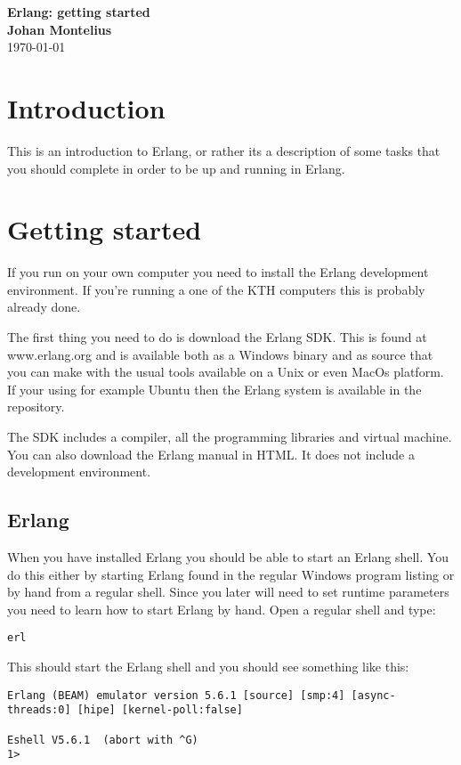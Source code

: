 \documentclass[a4paper,11pt]{article}
\newcommand{\nnsection}[1]{
\section*{#1}
\addcontentsline{toc}{section}{#1}
}
\begin{document}
\begin{center}
\vspace{20pt}
\textbf{\large Erlang: getting started}\\
\vspace{10pt}
\textbf{Johan Montelius}\\
\vspace{10pt}
\today{}
\end{center}

\nnsection{Introduction}

This is an introduction to Erlang, or rather its a description of some
tasks that you should complete in order to be up and running in Erlang.

\section{Getting started}

If you run on your own computer you need to install the Erlang
development environment. If you're running a one of the KTH computers
this is probably already done.

The first thing you need to do is download the Erlang SDK. This is
found at www.erlang.org and is available both as a Windows binary and
as source that you can make with the usual tools available on a Unix
or even MacOs platform. If your using for example Ubuntu then the
Erlang system is available in the repository.

The SDK includes a compiler, all the programming libraries and virtual
machine. You can also download the Erlang manual in HTML.  It does not
include a development environment.

\subsection{Erlang}

When you have installed Erlang you should be able to start an Erlang
shell. You do this either by starting Erlang found in the regular
Windows program listing or by hand from a regular shell. Since you
later will need to set runtime parameters you need to learn how to
start Erlang by hand. Open a regular shell and type:

\begin{verbatim}
erl
\end{verbatim}

\noindent This should start the Erlang shell and you should see something like this:

\begin{verbatim}
Erlang (BEAM) emulator version 5.6.1 [source] [smp:4] [async-threads:0] [hipe] [kernel-poll:false]

Eshell V5.6.1  (abort with ^G)
1>  
\end{verbatim}
\end{document}
